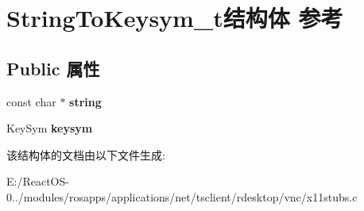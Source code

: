 \hypertarget{struct_string_to_keysym__t}{}\section{String\+To\+Keysym\+\_\+t结构体 参考}
\label{struct_string_to_keysym__t}
\subsection*{Public 属性}
\begin{DoxyCompactItemize}
\item 
\mbox{\label{struct_string_to_keysym__t_aea11a65112adb859af73d87d25bbf928}} 
const char $\ast$ {\bfseries string}
\item 
\mbox{\label{struct_string_to_keysym__t_ae93ccfd6ff005e9f4a59b39147e3b0e6}} 
Key\+Sym {\bfseries keysym}
\end{DoxyCompactItemize}


该结构体的文档由以下文件生成\+:\begin{DoxyCompactItemize}
\item 
E\+:/\+React\+O\+S-\/0../modules/rosapps/applications/net/tsclient/rdesktop/vnc/x11stubs.\+c\end{DoxyCompactItemize}
